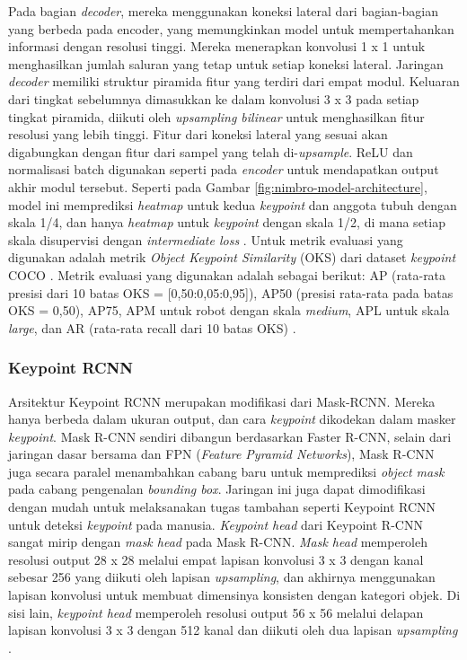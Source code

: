 Pada bagian \emph{decoder}, mereka menggunakan koneksi lateral dari bagian-bagian yang berbeda pada encoder, yang memungkinkan model untuk mempertahankan informasi dengan resolusi tinggi. Mereka menerapkan konvolusi 1 x 1 untuk menghasilkan jumlah saluran yang tetap untuk setiap koneksi lateral.
Jaringan \textit{decoder} memiliki struktur piramida fitur yang terdiri dari empat modul. Keluaran dari tingkat sebelumnya dimasukkan ke dalam konvolusi 3 x 3 pada setiap tingkat piramida, diikuti oleh \textit{upsampling bilinear} untuk menghasilkan fitur resolusi yang lebih tinggi.
Fitur dari koneksi lateral yang sesuai akan digabungkan dengan fitur dari sampel yang telah di-\textit{upsample}. ReLU dan normalisasi batch digunakan seperti pada \textit{encoder} untuk mendapatkan output akhir modul tersebut.
Seperti pada Gambar \ref{fig:nimbro-model-architecture}, model ini memprediksi \textit{heatmap} untuk kedua \textit{keypoint} dan anggota tubuh dengan skala 1/4, dan hanya \textit{heatmap} untuk \textit{keypoint} dengan skala 1/2, di mana setiap skala disupervisi dengan \textit{intermediate loss} \parencite{amini2021}.
Untuk metrik evaluasi yang digunakan adalah metrik \textit{Object Keypoint Similarity} (OKS) dari dataset \textit{keypoint} COCO \parencite{ronchi2017}.
Metrik evaluasi yang digunakan adalah sebagai berikut: AP (rata-rata presisi dari 10 batas OKS = [0,50:0,05:0,95]), AP50 (presisi rata-rata pada batas OKS = 0,50), AP75, APM untuk robot dengan skala \textit{medium}, APL untuk skala \textit{large}, dan AR (rata-rata recall dari 10 batas OKS) \parencite{amini2021}.

\subsubsection{Keypoint RCNN}
\label{subsubsec:rcnn}

Arsitektur Keypoint RCNN merupakan modifikasi dari Mask-RCNN. Mereka hanya berbeda dalam ukuran output, dan cara \textit{keypoint} dikodekan dalam masker \textit{keypoint}. Mask R-CNN sendiri dibangun berdasarkan Faster R-CNN,
selain dari jaringan dasar bersama dan FPN (\textit{Feature Pyramid Networks}), Mask R-CNN juga secara paralel menambahkan cabang baru untuk memprediksi \textit{object mask} pada cabang pengenalan \textit{bounding box}.
Jaringan ini juga dapat dimodifikasi dengan mudah untuk melaksanakan tugas tambahan seperti Keypoint RCNN untuk deteksi \textit{keypoint} pada manusia. \textit{Keypoint head} dari Keypoint R-CNN sangat mirip dengan \textit{mask head} pada Mask R-CNN. 
\textit{Mask head} memperoleh resolusi output 28 x 28 melalui empat lapisan konvolusi 3 x 3 dengan kanal sebesar 256 yang diikuti oleh lapisan \textit{upsampling}, dan akhirnya menggunakan lapisan konvolusi untuk membuat dimensinya konsisten dengan kategori objek.
Di sisi lain, \textit{keypoint head} memperoleh resolusi output 56 x 56 melalui delapan lapisan konvolusi 3 x 3 dengan 512 kanal dan diikuti oleh dua lapisan \textit{upsampling} \parencite{zhang2021}.

